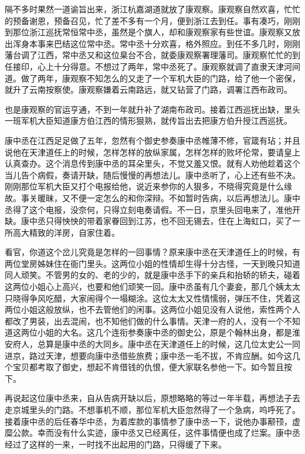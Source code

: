 \documentclass[12pt,UTF8]{ctexbook}
\begin{document}
{{{隔不多时果然一道谕旨出来，浙江杭嘉湖道就放了康观察。康观察自然欢喜，忙忙的预备谢恩，预备召见，忙了差不多有一个月，便到浙江去到任。事有凑巧，刚刚到那位浙江巡抚常恒常中丞，虽然是个旗人，却和康观察家有些世谊。康观察又放出浑身本事来巴结这位常中丞。常中丞十分欢喜，格外照应。到任不多几时，刚刚藩台调了江西，常中丞又和这位臬台不合，就委康观察署理藩司。康观察忙忙的到任接印，心上十分得意。不想过了两年，常中丞死了。康观察就调了直隶天津河间道。做了两年，康观察不知怎么的又走了一个军机大臣的门路，给了他一个密保，就升了云南按察使。康观察嫌着云南路远，就又钻营了门路，调署江西布政司。

也是康观察的官运亨通，不到一年就升补了湖南布政司。接着江西巡抚出缺，里头一班军机大臣知道康方伯江西的情形狠熟，就传旨出去把康方伯升授江西巡抚。

康中丞在江西足足做了五年，忽然有个御史参奏康中丞帷薄不修，官箴有玷；并且说他在天津道任上的时候，怎样怎样的放纵家属，怎样怎样的败坏伦常，要请皇上认真查办。这个消息传到康中丞的耳朵里头，不觉又羞又恨。就有人劝他趁着这个当儿告个病假，奏请开缺，随后慢慢的再想法儿。康中丞听了，心上还有些不决。刚刚那位军机大臣又打个电报给他，说近来参你的人狠多，不晓得究竟是什么缘故。事关暖昧，又不便一定怎么的和你深辩。不如暂时告病，以后再想法儿。康中丞得了这个电报，没奈何，只得立刻电奏请假。不一日，京里头回电来了，准他开缺。康中丞只得怏怏的带着家眷回到江苏，也不回无锡去，住在上海虹口，买了一所高大精致的洋房，自家住着。

看官，你道这个岔儿究竟是怎样的一回事情？原来康中丞在天津道任上的时候，有两位堂房姊妹住在衙门里头。这两位小姐的性情却生得十分古怪，一天到晚只知道同人顽笑。不管男的女的、老的少的，就是康中丞手下的亲兵和抬轿的轿夫，碰着这两位小姐心上高兴，也要和他们顽笑一回。康中丞虽有几个妻妾，那几个姨太太只晓得争风吃醋，大家闹得个一塌糊涂。这位太太又性情懦弱，弹压不住，凭着这两位小姐这般放纵，也不去管他们的闲事。这两位小姐见没有人说他，索性两个人都改了男装，出去混闹，也不知他们做的什么事情。天津一府的人，没有一个不知道这两位小姐的大名。这几个连衔参奏康中丞的御史公，原是个翰林出身，都是淮安府人，总算是康中丞的大同乡。康中丞在天津道任上的时候，这几位太史公一同进京，路过天津，想要向康中丞借些旅费；康中丞一毛不拔，不肯应酬。如今这几个宝贝都考取了御史，想起不肯借钱的仇恨，便大家联名参他一下。如今暂且按下。

再说起这位康中丞来，自从告病开缺以后，原想略略的等过一年半载，再想法子去走京城里头的门路。不想事机不顺，那位军机大臣忽然得了一个急病，呜呼死了。接着康中丞的后任春华中丞，为着库款的事情参了康中丞一下，说他办事颟顸，虚糜公款。幸而没有什么实迹，康中丞又已经离任，这件事情便也成了烂案。康中丞经过了这样的一来，一时找不出起用的门路，只得缓了下来。

}}}
\end{document}
